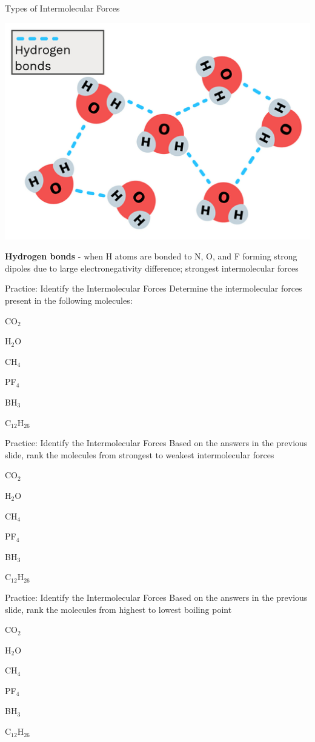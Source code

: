 \documentclass[11pt]{beamer}
\begin{document}
\begin{frame}{Types of Intermolecular Forces}
  \begin{center}
    \includegraphics[width=0.5\linewidth]{water_hbond}
  \end{center}
  \textbf{Hydrogen bonds} - when H atoms are bonded to
  N, O, and F forming strong dipoles due to large electronegativity
  difference; strongest intermolecular forces
\end{frame}

\begin{frame}{Practice: Identify the Intermolecular Forces}
  Determine the intermolecular forces present in the following molecules:

  CO$_2$

  H$_2$O

  CH$_4$

  PF$_4$

  BH$_3$

  C$_{12}$H$_{26}$
\end{frame}

\begin{frame}{Practice: Identify the Intermolecular Forces}
  Based on the answers in the previous slide, rank the molecules
  from strongest to weakest intermolecular forces
  
  CO$_2$

  H$_2$O

  CH$_4$

  PF$_4$

  BH$_3$

  C$_{12}$H$_{26}$
\end{frame}

\begin{frame}{Practice: Identify the Intermolecular Forces}
  Based on the answers in the previous slide, rank the molecules
  from highest to lowest boiling point
  
  CO$_2$

  H$_2$O

  CH$_4$

  PF$_4$

  BH$_3$

  C$_{12}$H$_{26}$
\end{frame}
\end{document}
